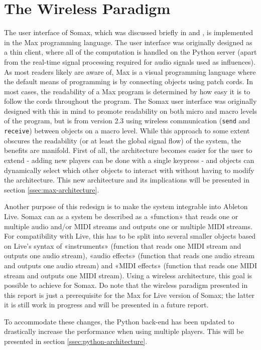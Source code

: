 \section{The Wireless Paradigm}\label{sec:wireless}
The user interface of Somax, which was discussed briefly in \cite{borg_2019} and \cite{borg2020dynamic}, is implemented in the Max\cite{maxmsp2021} programming language. The user interface was originally designed as a thin client, where all of the computation is handled on the Python server (apart from the real-time signal processing required for audio signals used as influences). As most readers likely are aware of, Max is a visual programming language where the default means of programming is by connecting objects using patch cords. In most cases, the readability of a Max program is determined by how easy it is to follow the cords throughout the program. The Somax user interface was originally designed with this in mind to promote readability on both micro and macro levels of the program, but is from version 2.3 using wireless communication (\texttt{send} and \texttt{receive}) between objects on a macro level. While this approach to some extent obscures the readability (or at least the global signal flow) of the system, the benefits are manifold. First of all, the architecture becomes easier for the user to extend - adding new players can be done with a single keypress - and objects can dynamically select which other objects to interact with without having to modify the architecture. This new architecture and its implications will be presented in section \ref{ssec:max-architecture}.

Another purpose of this redesign is to make the system integrable into Ableton Live. Somax can as a system be described as a «function» that reads one or multiple audio and/or MIDI streams and outputs one or multiple MIDI streams. For compatibility with Live, this has to be split into several smaller objects based on Live's syntax of «instruments» (function that reads one MIDI stream and outputs one audio stream), «audio effects» (function that reads one audio stream and outputs one audio stream) and «MIDI effects» (function that reads one MIDI stream and outputs one MIDI stream). Using a wireless architecture, this goal is possible to achieve for Somax. Do note that the wireless paradigm presented in this report is just a prerequisite for the Max for Live version of Somax; the latter it is still work in progress and will be presented in a future report.

To accommodate these changes, the Python back-end has been updated to drastically increase the performance when using multiple players. This will be presented in section \ref{ssec:python-architecture}.

